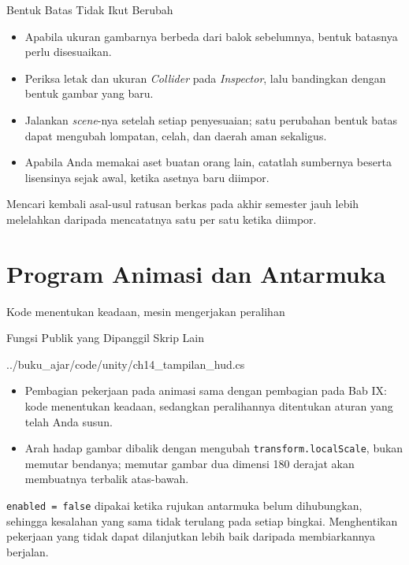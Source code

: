 \documentclass[aspectratio=169,10pt]{beamer}
\begin{document}
\begin{frame}{Bentuk Batas Tidak Ikut Berubah}
\begin{itemize}
  \item Apabila ukuran gambarnya berbeda dari balok sebelumnya, bentuk batasnya
        perlu disesuaikan.
  \item Periksa letak dan ukuran \emph{Collider} pada \emph{Inspector}, lalu
        bandingkan dengan bentuk gambar yang baru.
  \item Jalankan \emph{scene}-nya setelah setiap penyesuaian; satu perubahan
        bentuk batas dapat mengubah lompatan, celah, dan daerah aman sekaligus.
  \item Apabila Anda memakai aset buatan orang lain, catatlah sumbernya beserta
        lisensinya sejak awal, ketika asetnya baru diimpor.
\end{itemize}
\vspace{0.12cm}
\begin{peringatan}
Mencari kembali asal-usul ratusan berkas pada akhir semester jauh lebih
melelahkan daripada mencatatnya satu per satu ketika diimpor.
\end{peringatan}
\end{frame}

\section{Program Animasi dan Antarmuka}
  {Kode menentukan keadaan, mesin mengerjakan peralihan}

\begin{frame}[fragile]{Fungsi Publik yang Dipanggil Skrip Lain}

  {../buku_ajar/code/unity/ch14_tampilan_hud.cs}
\begin{itemize}
  \item Pembagian pekerjaan pada animasi sama dengan pembagian pada Bab IX:
        kode menentukan keadaan, sedangkan peralihannya ditentukan aturan yang
        telah Anda susun.
  \item Arah hadap gambar dibalik dengan mengubah \texttt{transform.localScale},
        bukan memutar bendanya; memutar gambar dua dimensi 180 derajat akan
        membuatnya terbalik atas-bawah.
\end{itemize}
\vspace{0.10cm}
\begin{kotak}
\texttt{enabled = false} dipakai ketika rujukan antarmuka belum dihubungkan,
sehingga kesalahan yang sama tidak terulang pada setiap bingkai. Menghentikan
pekerjaan yang tidak dapat dilanjutkan lebih baik daripada membiarkannya
berjalan.
\end{kotak}
\end{frame}
\end{document}
